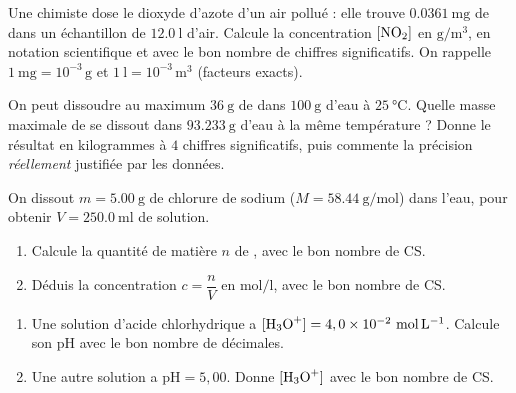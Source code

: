 \documentclass[11pt,a4paper]{article}
\begin{document}
\begin{exo}
Une chimiste dose le dioxyde d'azote d'un air pollué : elle trouve $\qty{0,0361}{\milli\gram}$ de
 dans un échantillon de $\qty{12,0}{\litre}$ d'air. Calcule la concentration $[\ce{NO2}]$ en
$\si{\gram\per\cubic\metre}$, en notation scientifique et avec le bon nombre de chiffres significatifs.
On rappelle $\qty{1}{\milli\gram}=10^{-3}\,\si{\gram}$ et $\qty{1}{\litre}=10^{-3}\,\si{\cubic\metre}$
(facteurs exacts).
\end{exo}

\begin{exo}
On peut dissoudre au maximum $\qty{36}{\gram}$ de  dans $\qty{100}{\gram}$ d'eau à
$\qty{25}{\celsius}$. Quelle masse maximale de  se dissout dans $\qty{93,233}{\gram}$ d'eau à la
même température ? Donne le résultat en kilogrammes à $4$ chiffres significatifs, puis commente la
précision \emph{réellement} justifiée par les données.
\end{exo}

\begin{exo}
On dissout $m=\qty{5,00}{\gram}$ de chlorure de sodium ($M=\qty{58,44}{\gram\per\mole}$) dans l'eau, pour
obtenir $V=\qty{250,0}{\milli\litre}$ de solution.
\begin{enumerate}[label=\alph*)]
  \item Calcule la quantité de matière $n$ de , avec le bon nombre de CS.
  \item Déduis la concentration $c=\dfrac{n}{V}$ en $\si{\mol\per\litre}$, avec le bon nombre de CS.
\end{enumerate}
\end{exo}

\begin{exo}
\begin{enumerate}[label=\alph*)]
  \item Une solution d'acide chlorhydrique a $[\ce{H3O+}]=4,0\times10^{-2}\ \si{\mol\per\litre}$. Calcule
        son pH avec le bon nombre de décimales.
  \item Une autre solution a $\mathrm{pH}=5,00$. Donne $[\ce{H3O+}]$ avec le bon nombre de CS.
\end{enumerate}
\end{exo}
\end{document}
